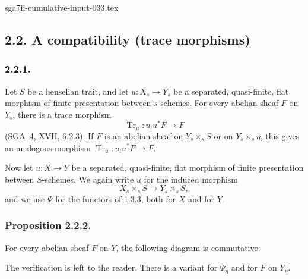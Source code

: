 \begin{filecontents*}{sga7ii-cumulative-input-033.tex}
\subsection*{2.2. A compatibility (trace morphisms)}

\subsubsection*{2.2.1.}
Let $S$ be a henselian trait, and let
$u:X_s\longrightarrow Y_s$ be a separated, quasi-finite, flat
morphism of finite presentation between $s$-schemes.  For every
abelian sheaf $F$ on $Y_s$, there is a trace morphism
\[
\operatorname{Tr}_u:u_!u^*F\longrightarrow F
\]
(SGA~4, XVII, 6.2.3).  If $F$ is an abelian sheaf on
$Y_s\times_sS$ or on $Y_s\times_s\eta$, this gives an analogous
morphism $\operatorname{Tr}_u:u_!u^*F\longrightarrow F$.

Now let $u:X\longrightarrow Y$ be a separated, quasi-finite, flat
morphism of finite presentation between $S$-schemes.  We again write
$u$ for the induced morphism
\[
X_s\times_sS\longrightarrow Y_s\times_sS,
\]
and we use $\Psi$ for the functors of 1.3.3, both for $X$ and for $Y$.

\subsubsection*{Proposition 2.2.2.}
\underline{For every abelian sheaf $F$ on $Y$, the following diagram
is commutative:}
\begin{center}
\end{center}
The verification is left to the reader.  There is a variant for
$\Psi_\eta$ and for $F$ on $Y_\eta$.


\end{filecontents*}
